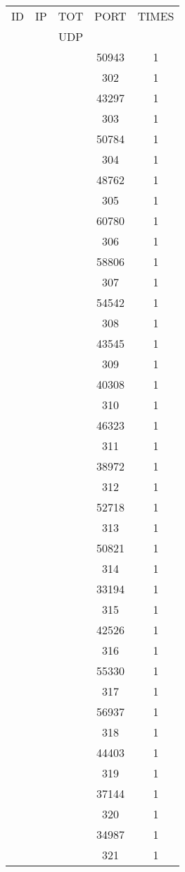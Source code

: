 \documentclass[a4paper]{scrartcl}
\begin{document}
\begin{minipage}[b]{0.5\linewidth}
\begin{tabular}{| c | c | c | c | c |}
\hline
ID & IP & TOT & PORT & TIMES \\ 
   &    & UDP &      &       \\ 
\hline
& & & 50943 & 1 \\ & & & 302 & 1 \\ & & & 43297 & 1 \\ & & & 303 & 1 \\ & & & 50784 & 1 \\ & & & 304 & 1 \\ & & & 48762 & 1 \\ & & & 305 & 1 \\ & & & 60780 & 1 \\ & & & 306 & 1 \\ & & & 58806 & 1 \\ & & & 307 & 1 \\ & & & 54542 & 1 \\ & & & 308 & 1 \\ & & & 43545 & 1 \\ & & & 309 & 1 \\ & & & 40308 & 1 \\ & & & 310 & 1 \\ & & & 46323 & 1 \\ & & & 311 & 1 \\ & & & 38972 & 1 \\ & & & 312 & 1 \\ & & & 52718 & 1 \\ & & & 313 & 1 \\ & & & 50821 & 1 \\ & & & 314 & 1 \\ & & & 33194 & 1 \\ & & & 315 & 1 \\ & & & 42526 & 1 \\ & & & 316 & 1 \\ & & & 55330 & 1 \\ & & & 317 & 1 \\ & & & 56937 & 1 \\ & & & 318 & 1 \\ & & & 44403 & 1 \\ & & & 319 & 1 \\ & & & 37144 & 1 \\ & & & 320 & 1 \\ & & & 34987 & 1 \\ & & & 321 & 1 \\ \hline\end{tabular}\end{minipage} \hfill\begin{minipage}[b]{0.5\linewidth}\begin{tabular}{| c | c | c | c | c |}

\end{tabular}
\end{minipage}
\end{document}
